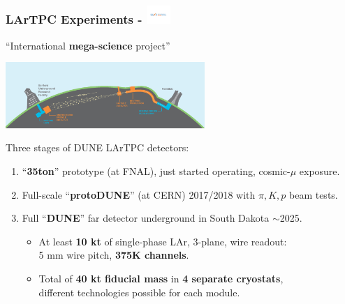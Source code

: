 \begin{frame}[fragile]
  \frametitle{LArTPC Experiments - \includegraphics[height=7mm,trim=4cm 9.2cm 4cm 9.3cm,clip,valign=c]{DUNElogo_colorHORIZONTAL.pdf}}
  \begin{center}
    ``International \textbf{mega-science} project''

    \includegraphics[height=25mm]{LBNF_Graphic_021715-1024x340.png}
  \end{center}


  Three stages of DUNE LArTPC detectors:
  \begin{enumerate}\footnotesize
  \item ``\textbf{35ton}'' prototype (at FNAL), just started operating, cosmic-$\mu$ exposure. 
  \item Full-scale ``\textbf{protoDUNE}'' (at CERN) 2017/2018 with $\pi, K, p$ beam tests.
  \item Full ``\textbf{DUNE}'' far detector underground in South Dakota $\sim$2025.
    \begin{itemize}
    \item At least \textbf{10 kt} of single-phase LAr, 3-plane, wire readout: \\
      5 mm wire pitch, \textbf{375K channels}.

    \item Total of \textbf{40 kt fiducial mass} in \textbf{4 separate cryostats}, \\
      \footnotesize{different technologies possible for each module.}

    \end{itemize}
  \end{enumerate}

\end{frame}

